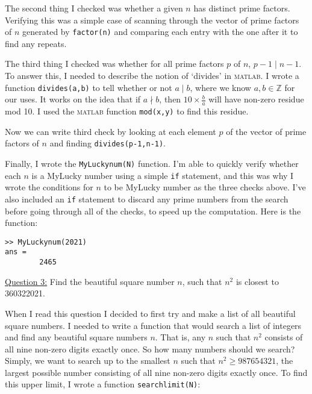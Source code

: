 \documentclass[a4paper,12pt]{article}
\begin{document}
The second thing I checked was whether a given $n$ has distinct prime factors. Verifying this was a simple case of scanning through the vector of prime factors of $n$ generated by \verb!factor(n)! and comparing each entry with the one after it to find any repeats.
\newpage

The third thing I checked was whether for all prime factors $p$ of $n$,  $p-1 \mid n-1$. To answer this, I needed to describe the notion of `divides' in \textsc{matlab}. I wrote a function \verb!divides(a,b)! to tell whether or not $a \mid b$, where we know $a,b \in \mathbb{Z}$ for our uses. It works on the idea that if $a \nmid b$, then $10 \times \frac{b}{a}$ will have non-zero residue mod 10. I used the \textsc{matlab} function \verb!mod(x,y)! to find this residue.


Now we can write third check by looking at each element $p$ of the vector of prime factors of $n$ and finding \verb!divides(p-1,n-1)!.


Finally, I wrote the \verb!MyLuckynum(N)! function. I'm able to quickly verify whether each $n$ is a MyLucky number using a simple \verb!if! statement, and this was why I wrote the conditions for $n$ to be MyLucky number as the three checks above. I've also included an \verb!if! statement to discard any prime numbers from the search before going through all of the checks, to speed up the computation. Here is the function: \newpage


\begin{lstlisting}
>> MyLuckynum(2021)
ans =
        2465
\end{lstlisting}

\noindent\large\underline{Question 3:} \hspace{0.25cm} Find the beautiful square number $n$, such that $n^2$ is closest to 360322021.



When I read this question I decided to first try and make a list of all beautiful square numbers. I needed to write a function that would search a list of integers and find any beautiful square numbers $n$. That is, any $n$ such that $n^2$ consists of all nine non-zero digits exactly once. So how many numbers should we search? Simply, we want to search up to the smallest $n$ such that $n^2 \geq 987654321$, the largest possible number consisting of all nine non-zero digits exactly once. To find this upper limit, I wrote a function \verb!searchlimit(N)!:
\end{document}
